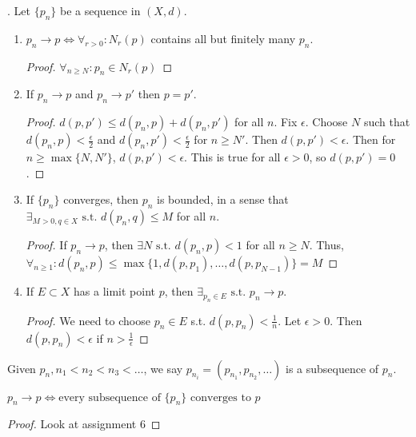 \begin{theorem}
	\label{thm:3.2}. Let $\{p_n\}$ be a sequence in $(X,d)$.
	\begin{enumerate}[label=(\alph*)]
		\item $p_n\to p \Leftrightarrow \forall_{r >0}: N_r(p)$ contains all but finitely many $p_n$.
		      \begin{proof}
			      $\forall_{n \ge N}: p_n \in N_r(p)$
		      \end{proof}
		\item If $p_n\to p$ and $p_n \to p'$ then $p=p'$.
		      \begin{proof}
			      $d(p,p')\le d(p_n,p)+d(p_n,p')$ for all $n$.
			      Fix $\epsilon$. Choose $N$ such that $d(p_n,p)<\frac{\epsilon}{2}$ and $d(p_n,p')<\frac{\epsilon}{2}$ for $n\ge N'$. Then $d(p,p')< \epsilon$.
			      Then for $n\ge \max\{N,N'\}$, $d(p,p')< \epsilon$. This is true for all $\epsilon>0$, so $d(p,p')=0$.
		      \end{proof}
		\item If $\{p_n\}$ converges, then ${p}_{n} $ is bounded, in a sense that $\exists_{M>0,q \in X} \text{ s.t. } d(p_n,q)\le M$ for all $n$.
		      \begin{proof}
			      If $p_n \to p$, then $\exists N \text{ s.t. } d(p_n,p)<1 $ for all $n\ge N$. Thus, $\forall_{n \ge 1}: d(p_n,p)\le \max\{1,d(p,p_1),\ldots ,d(p,p_{N-1})\}=M$
		      \end{proof}
		\item If $E \subset X$ has a limit point $p$, then $\exists_{{p}_{n} \in E} \text{ s.t. } p_n \to p$.
		      \begin{proof}
			      We need to choose $p_n \in E$ s.t. $d(p,p_n)<\frac{1}{n}$.
			      Let $\epsilon>0$. Then $d(p,p_n)<\epsilon$ if $n>\frac{1}{\epsilon}$
		      \end{proof}
	\end{enumerate}
\end{theorem}

\begin{definition}
	\label{def:3.5}
	Given ${p}_{n}, n_1<n_2<n_3<\ldots $, we say ${p}_{n_i}=(p_{n_1},p_{n_2},\ldots )$ is a subsequence of ${p}_{n}$.
\end{definition}

\begin{lemma}
	$p_n\to p \Leftrightarrow \text{every subsequence of $\{p_n\}$ converges to $p$} $

	\begin{proof}
		Look at assignment 6
	\end{proof}
\end{lemma}


